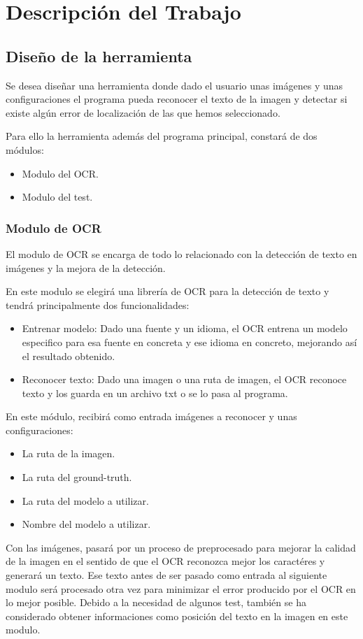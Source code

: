 \chapter{Descripción del Trabajo}
\label{cap:descripcionTrabajo}
\section{Diseño de la herramienta}
\label{sec:Descripción de la herramienta}
Se desea diseñar una herramienta donde dado el usuario unas imágenes y unas configuraciones el programa pueda reconocer el texto de la imagen y detectar si existe algún error de localización de las que hemos seleccionado.

Para ello la herramienta además del programa principal, constará de dos módulos:
\begin{itemize}
	\item Modulo del OCR.
	\item Modulo del test.
\end{itemize}
\subsection{Modulo de OCR}
El modulo de OCR se encarga de todo lo relacionado con la detección de texto en imágenes y la mejora de la detección.

En este modulo se elegirá una librería de OCR para la detección de texto y tendrá principalmente dos funcionalidades: 
\begin{itemize}
	\item Entrenar modelo: Dado una fuente y un idioma, el OCR entrena un modelo especifico para esa fuente en concreta y ese idioma en concreto, mejorando así el resultado obtenido.
	\item Reconocer texto: Dado una imagen o una ruta de imagen, el OCR reconoce texto y los guarda en un archivo txt o se lo pasa al programa.
\end{itemize}
En este módulo, recibirá como entrada imágenes a reconocer y unas configuraciones:
\begin{itemize}
	\item La ruta de la imagen.
	\item La ruta del ground-truth.
	\item La ruta del modelo a utilizar.
	\item Nombre del modelo a utilizar.
\end{itemize}
Con las imágenes, pasará por un proceso de preprocesado para mejorar la calidad de la imagen en el sentido de que el OCR reconozca mejor los caractéres y generará un texto.
Ese texto antes de ser pasado como entrada al siguiente modulo será procesado otra vez para minimizar el error producido por el OCR en lo mejor posible.
Debido a la necesidad de algunos test, también se ha considerado obtener informaciones como posición del texto en la imagen en este modulo.
